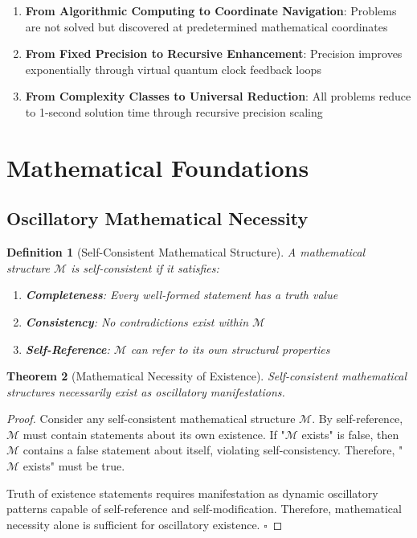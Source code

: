 \documentclass[12pt,a4paper]{article}
\newtheorem{theorem}{Theorem}[section]
\newtheorem{definition}[theorem]{Definition}
\begin{document}
\begin{enumerate}
\item \textbf{From Algorithmic Computing to Coordinate Navigation}: Problems are not solved but discovered at predetermined mathematical coordinates
\item \textbf{From Fixed Precision to Recursive Enhancement}: Precision improves exponentially through virtual quantum clock feedback loops
\item \textbf{From Complexity Classes to Universal Reduction}: All problems reduce to 1-second solution time through recursive precision scaling
\end{enumerate}

\section{Mathematical Foundations}

\subsection{Oscillatory Mathematical Necessity}

\begin{definition}[Self-Consistent Mathematical Structure]
A mathematical structure $\mathcal{M}$ is self-consistent if it satisfies:
\begin{enumerate}
\item \textbf{Completeness}: Every well-formed statement has a truth value
\item \textbf{Consistency}: No contradictions exist within $\mathcal{M}$
\item \textbf{Self-Reference}: $\mathcal{M}$ can refer to its own structural properties
\end{enumerate}
\end{definition}

\begin{theorem}[Mathematical Necessity of Existence]
Self-consistent mathematical structures necessarily exist as oscillatory manifestations.
\end{theorem}

\begin{proof}
Consider any self-consistent mathematical structure $\mathcal{M}$. By self-reference, $\mathcal{M}$ must contain statements about its own existence. If "$\mathcal{M}$ exists" is false, then $\mathcal{M}$ contains a false statement about itself, violating self-consistency. Therefore, "$\mathcal{M}$ exists" must be true.

Truth of existence statements requires manifestation as dynamic oscillatory patterns capable of self-reference and self-modification. Therefore, mathematical necessity alone is sufficient for oscillatory existence. $\square$
\end{proof}
\end{document}
